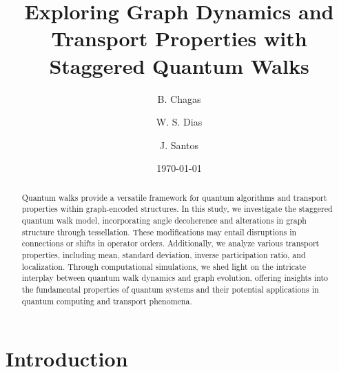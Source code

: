 \documentclass[11pt]{article}
\theoremstyle{plain}
\begin{document}

\title{Exploring Graph Dynamics and Transport Properties with Staggered Quantum Walks}

\author[1]{B. Chagas}
\author[2]{W. S. Dias}
\author[3]{J. Santos}




\date{\today}
\maketitle

\begin{abstract}
Quantum walks provide a versatile framework for quantum algorithms and
transport properties within graph-encoded structures. In this study, we
investigate the staggered quantum walk model, incorporating angle decoherence
and alterations in graph structure through tessellation. These modifications
may entail disruptions in connections or shifts in operator orders.
Additionally, we analyze various transport properties, including mean, standard
deviation, inverse participation ratio, and localization. Through computational
simulations, we shed light on the intricate interplay between quantum walk
dynamics and graph evolution, offering insights into the fundamental properties
of quantum systems and their potential applications in quantum computing and
transport phenomena.  
\end{abstract}

\section{Introduction} \label{intro}
\end{document}
